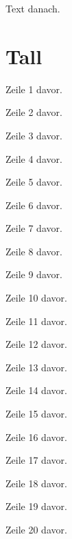 Text danach.

\clearpage
\section{Tall}
Zeile 1 davor.

Zeile 2 davor.

Zeile 3 davor.

Zeile 4 davor.

Zeile 5 davor.

Zeile 6 davor.

Zeile 7 davor.

Zeile 8 davor.

Zeile 9 davor.

Zeile 10 davor.

Zeile 11 davor.

Zeile 12 davor.

Zeile 13 davor.

Zeile 14 davor.

Zeile 15 davor.

Zeile 16 davor.

Zeile 17 davor.

Zeile 18 davor.

Zeile 19 davor.

Zeile 20 davor.

